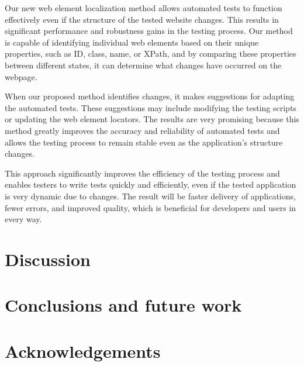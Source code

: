 \documentclass{article}
\begin{document}
Our new web element localization method allows automated tests to function effectively even if the structure of the tested website changes. This results in significant performance and robustness gains in the testing process. Our method is capable of identifying individual web elements based on their unique properties, such as ID, class, name, or XPath, and by comparing these properties between different states, it can determine what changes have occurred on the webpage.

When our proposed method identifies changes, it makes suggestions for adapting the automated tests. These suggestions may include modifying the testing scripts or updating the web element locators. The results are very promising because this method greatly improves the accuracy and reliability of automated tests and allows the testing process to remain stable even as the application's structure changes.

This approach significantly improves the efficiency of the testing process and enables testers to write tests quickly and efficiently, even if the tested application is very dynamic due to changes. The result will be faster delivery of applications, fewer errors, and improved quality, which is beneficial for developers and users in every way.

\maketitle

\section{Discussion}


\maketitle

\section{Conclusions and future work}


\maketitle

\section{Acknowledgements}
\end{document}

